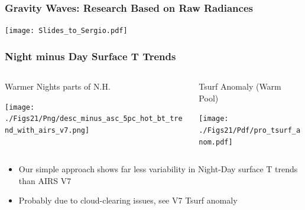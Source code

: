 \documentclass[10pt,t]{beamer}
\begin{document}
\begin{frame}
\frametitle{Gravity Waves: Research Based on Raw Radiances}  
\vspace{-0.35in}
\begin{center}
\texttt{[image: Slides\_to\_Sergio.pdf]}
\end{center}
\end{frame}
\begin{frame}
\frametitle{Night minus Day Surface T Trends}
\vspace{-0.2in}

\begin{columns}
\begin{column}{0.55\columnwidth}
\begin{block}{\footnotesize Warmer Nights parts of N.H.}
\vspace{-0.1in}
\begin{center}
\texttt{[image: ./Figs21/Png/desc\_minus\_asc\_5pc\_hot\_bt\_trend\_with\_airs\_v7.png]}
\end{center}
\end{block}
\end{column}


\begin{column}{0.5\columnwidth}
\begin{block}{\footnotesize Tsurf Anomaly (Warm Pool)}
\vspace{-0.05in}
\begin{center}
\texttt{[image: ./Figs21/Pdf/pro\_tsurf\_anom.pdf]}
\end{center}
\end{block}
\end{column}
\end{columns}

\begin{itemize}
\item Our simple approach shows far less variability in Night-Day surface T trends than AIRS V7
\item Probably due to cloud-clearing issues, see V7 Tsurf anomaly
\end{itemize}
\end{frame}
\end{document}
